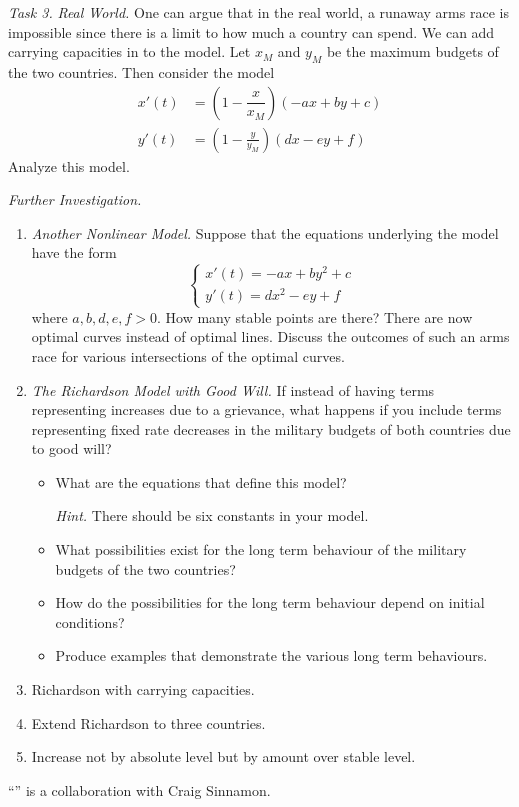 \emph{Task 3.} \emph{Real World.}
	One can argue that in the real world, a runaway arms race is impossible since there is a limit to how much a country can spend. We can add carrying capacities in to the model. Let $x_M$ and $y_M$ be the maximum budgets of the two countries. Then consider the model
\begin{align*}
x'(t) &= \left(1- \dfrac{x}{x_M}\right) (-ax + by + c)\\
y'(t) &=\left(1-\frac{y}{y_M}\right)(dx-ey+f)
\end{align*}
Analyze this model.

\vfill

\emph{Further Investigation.}
\begin{enumerate}[label=\emph{\arabic*.}]
\item \emph{Another Nonlinear Model.} Suppose that the equations underlying the model have the form
$$
\begin{cases}
x'(t) = -ax+by^2+c\\
y'(t) =dx^2-ey+f	
\end{cases}
$$
where $a,b,d,e,f>0$. How many stable points are there? 
There are now optimal curves instead of optimal lines. 
Discuss the outcomes of such an arms race for various intersections of the optimal curves.

\item \emph{The Richardson Model with Good Will.} If instead of having terms representing increases due to a grievance, what happens if you include terms representing fixed rate decreases in the military budgets of both countries due to good will?
\begin{itemize}
\item What are the equations that define this model? 

\emph{Hint.} There should be six constants in your model.

\item What possibilities exist for the long term behaviour of the military budgets of the two countries?
\item How do the possibilities for the long term behaviour depend on initial conditions?
\item Produce examples that demonstrate the various long term behaviours.
\end{itemize}

\item Richardson with carrying capacities.

\item Extend Richardson to three countries.

\item Increase not by absolute level but by amount over stable level.
\end{enumerate}

\vfill

\begin{graybox}
\hfill ``\armstitle'' is a collaboration with Craig Sinnamon.
\end{graybox}

\begin{noexercises}
\end{noexercises}
